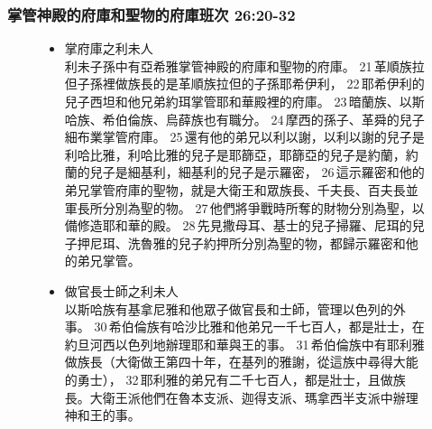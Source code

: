 \subsubsection{掌管神殿的府庫和聖物的府庫班次 26:20-32}
\begin{figure}[H]
\begin{minipage}{.7\textwidth} %
\end{minipage}
\hspace{-60mm}
\begin{minipage}{.6\textwidth} %
\vspace{60mm}
\begin{itemize}
\item 掌府庫之利未人\\
利未子孫中有亞希雅掌管神殿的府庫和聖物的府庫。 21 革順族拉但子孫裡做族長的是革順族拉但的子孫耶希伊利， 22 耶希伊利的兒子西坦和他兄弟約珥掌管耶和華殿裡的府庫。 23 暗蘭族、以斯哈族、希伯倫族、烏薛族也有職分。 24 摩西的孫子、革舜的兒子細布業掌管府庫。 25 還有他的弟兄以利以謝，以利以謝的兒子是利哈比雅，利哈比雅的兒子是耶篩亞，耶篩亞的兒子是約蘭，約蘭的兒子是細基利，細基利的兒子是示羅密， 26 這示羅密和他的弟兄掌管府庫的聖物，就是大衛王和眾族長、千夫長、百夫長並軍長所分別為聖的物。 27 他們將爭戰時所奪的財物分別為聖，以備修造耶和華的殿。 28 先見撒母耳、基士的兒子掃羅、尼珥的兒子押尼珥、洗魯雅的兒子約押所分別為聖的物，都歸示羅密和他的弟兄掌管。
\item 做官長士師之利未人\\
以斯哈族有基拿尼雅和他眾子做官長和士師，管理以色列的外事。 30 希伯倫族有哈沙比雅和他弟兄一千七百人，都是壯士，在約旦河西以色列地辦理耶和華與王的事。 31 希伯倫族中有耶利雅做族長（大衛做王第四十年，在基列的雅謝，從這族中尋得大能的勇士）， 32 耶利雅的弟兄有二千七百人，都是壯士，且做族長。大衛王派他們在魯本支派、迦得支派、瑪拿西半支派中辦理神和王的事。
\end{itemize}
\end{minipage}
\end{figure}



